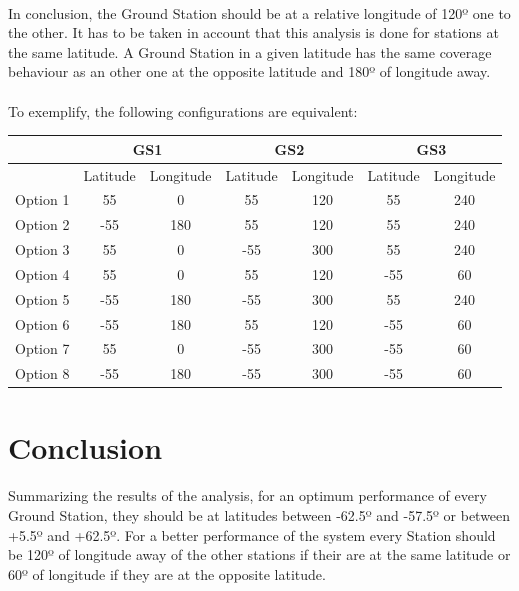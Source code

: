 \documentclass[12pt,a4paper]{report}
\begin{document}
\paragraph{}
In conclusion, the Ground Station should be at a relative longitude of 120º one to the other. It has to be taken in account that this analysis is done for stations at the same latitude. A Ground Station in a given latitude has the same coverage behaviour as an other one at the opposite latitude and 180º of longitude away.
\paragraph{}
To exemplify, the following configurations are equivalent:

\begin{center}
\begin{tabular}{|c|c|c|c|c|c|c|}
\hline 
 & \multicolumn{2}{c|}{GS1} & \multicolumn{2}{c|}{GS2} & \multicolumn{2}{c|}{GS3} \\ 
\hline 
 & Latitude & Longitude & Latitude & Longitude & Latitude & Longitude \\ 
\hline 
Option 1 & 55 & 0 & 55 & 120 & 55 & 240 \\ 
\hline 
Option 2 & -55 & 180 & 55 & 120 & 55 & 240 \\ 
\hline 
Option 3 & 55 & 0 & -55 & 300 & 55 & 240 \\ 
\hline 
Option 4 & 55 & 0 & 55 & 120 & -55 & 60 \\ 
\hline 
Option 5 & -55 & 180 & -55 & 300 & 55 & 240 \\ 
\hline 
Option 6 & -55 & 180 & 55 & 120 & -55 & 60 \\ 
\hline 
Option 7 & 55 & 0 & -55 & 300 & -55 & 60 \\ 
\hline 
Option 8 & -55 & 180 & -55 & 300 & -55 & 60 \\ 
\hline 
\end{tabular}
\end{center}

\section{Conclusion}
\paragraph{}
Summarizing the results of the analysis, for an optimum performance of every Ground Station, they should be at latitudes between -62.5º and -57.5º or between +5.5º and +62.5º. For a better performance of the system every Station should be 120º of longitude away of the other stations if their are at the same latitude or 60º of longitude if they are at the opposite latitude.
\end{document}
